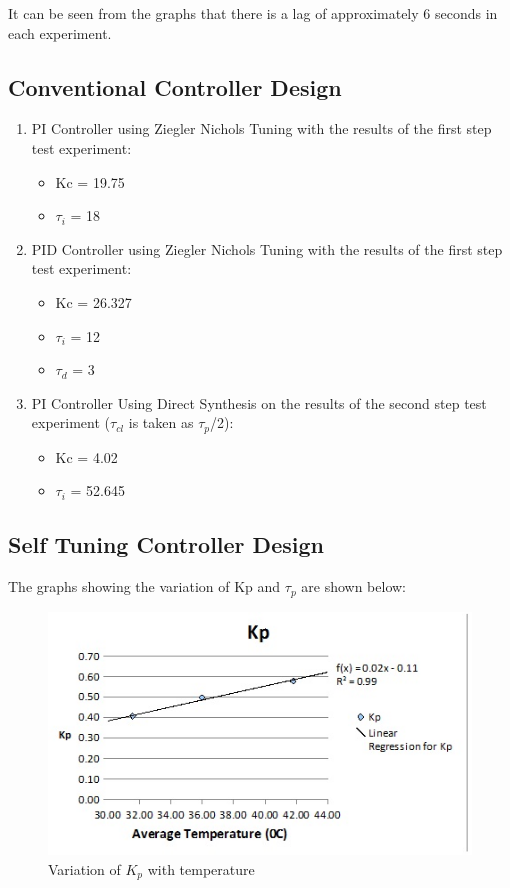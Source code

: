 It can be seen from the graphs that there is a lag of approximately 6 seconds in each experiment. 

\subsection{Conventional Controller Design}
\begin{enumerate}
	\item PI Controller using Ziegler Nichols Tuning with the results of the first step test experiment: 
\begin{itemize}
	\item Kc  = 19.75 
	\item $\tau_i$ = 18

\end{itemize}


	\item PID Controller using Ziegler Nichols Tuning with the results of the first step test experiment: 
\begin{itemize}
	\item Kc  = 26.327 
	\item $\tau_i$ = 12
	\item $\tau_d$ = 3

\end{itemize}


	\item PI Controller Using Direct Synthesis on the results of the second step test experiment ($\tau_{cl}$ is taken as $\tau_p$/2):
\begin{itemize}
	\item Kc  = 4.02
	\item $\tau_i$ = 52.645

\end{itemize}


\end{enumerate}
\subsection{Self Tuning Controller Design}
\label{selftuningdesign}
The graphs showing the variation of Kp and $\tau_p$ are shown below:

\begin{figure}[h]
\centering
	\includegraphics[width = \textwidth]{Vikas_self/report_tex/parameter_estimation/kp.jpg}
		\caption{Variation of $K_p$ with temperature}
	\label{kp}
\end{figure}


